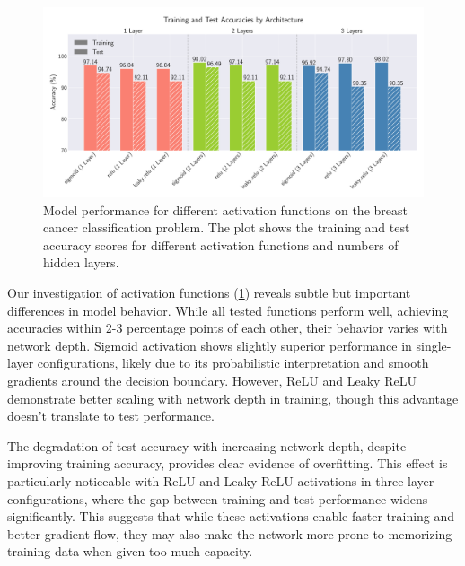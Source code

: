 \clearpage
\onecolumngrid
\begin{figure}[h!]
    \begin{minipage}{\textwidth}
        \centering
        \includegraphics[width = .9\textwidth]{../figs/classification_activations_layers.pdf}
        \caption{Model performance for different activation functions on the breast cancer classification problem. The plot shows the training and test accuracy scores for different activation functions and numbers of hidden layers.}
        \label{fig:NN_Classification_activations_layers}
    \end{minipage}
\end{figure}
\twocolumngrid

Our investigation of activation functions (\cref{fig:NN_Classification_activations_layers}) reveals subtle but important differences in model behavior. While all tested functions perform well, achieving accuracies within 2-3 percentage points of each other, their behavior varies with network depth. Sigmoid activation shows slightly superior performance in single-layer configurations, likely due to its probabilistic interpretation and smooth gradients around the decision boundary. However, ReLU and Leaky ReLU demonstrate better scaling with network depth in training, though this advantage doesn't translate to test performance.

The degradation of test accuracy with increasing network depth, despite improving training accuracy, provides clear evidence of overfitting. This effect is particularly noticeable with ReLU and Leaky ReLU activations in three-layer configurations, where the gap between training and test performance widens significantly. This suggests that while these activations enable faster training and better gradient flow, they may also make the network more prone to memorizing training data when given too much capacity.

